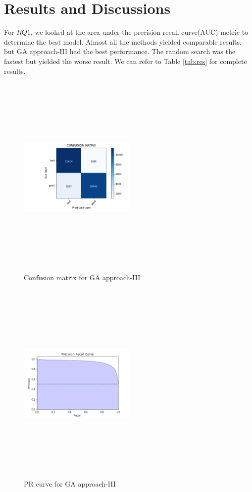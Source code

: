 \documentclass[conference]{IEEEtran}
\begin{document}
\section{Results and Discussions}
For $RQ1$, we looked at the area under the precision-recall curve(AUC) metric to determine the best model. Almost all the methods yielded comparable results, but GA approach-III had the best performance. The random search was the fastest but yielded the worse result. We can refer to Table \ref{tab:res} for complete results.


\begin{figure}
\includegraphics[width=0.5\textwidth, height=10cm, keepaspectratio]{genetic-type-3/genetic-type-3-confusion-matrix.png}
\caption{Confusion matrix for GA approach-III}
 \label{fig:confusion}
\end{figure}
\begin{figure}
\includegraphics[width=0.5\textwidth, height=10cm, keepaspectratio]{genetic-type-3/Precision-Recall-Curve-genetic-type-3.png}
\caption{PR curve for GA approach-III}
\label{fig:prga}
\end{figure}
\end{document}
